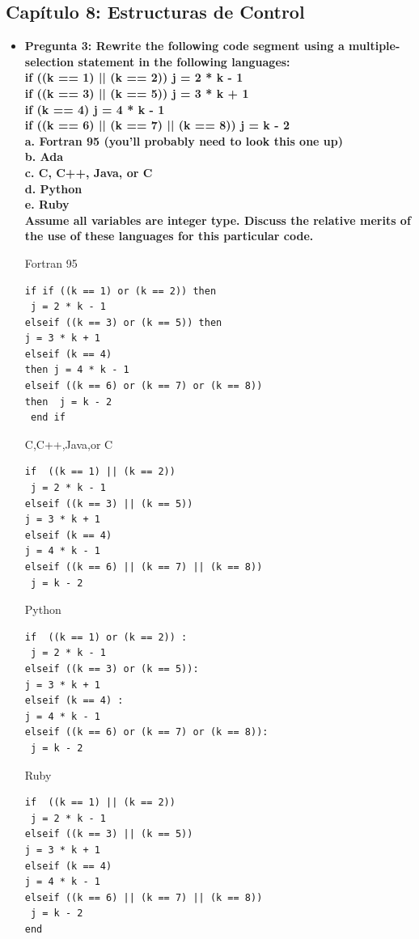 \documentclass[12pt,oneside]{article}
\begin{document}
		\subsection{Capítulo 8: Estructuras de Control}	
			\begin{itemize}
				\item {\bf Pregunta 3: Rewrite the following code segment using a multiple-selection statement
in the following languages:\\
if ((k == 1) || (k == 2)) j = 2 * k - 1\\
if ((k == 3) || (k == 5)) j = 3 * k + 1\\
if (k == 4) j = 4 * k - 1\\
if ((k == 6) || (k == 7) || (k == 8)) j = k - 2\\
a. Fortran 95 (you’ll probably need to look this one up)\\
b. Ada\\
c. C, C++, Java, or C\\
d. Python\\
e. Ruby\\
Assume all variables are integer type. Discuss the relative merits of the
use of these languages for this particular code.}	

Fortran  95
\begin{lstlisting}[frame=single]
if if ((k == 1) or (k == 2)) then 
 j = 2 * k - 1
elseif ((k == 3) or (k == 5)) then 
j = 3 * k + 1
elseif (k == 4) 
then j = 4 * k - 1
elseif ((k == 6) or (k == 7) or (k == 8))
then  j = k - 2
 end if 
\end{lstlisting}

C,C++,Java,or C
\begin{lstlisting}[frame=single]
if  ((k == 1) || (k == 2)) 
 j = 2 * k - 1
elseif ((k == 3) || (k == 5)) 
j = 3 * k + 1
elseif (k == 4) 
j = 4 * k - 1
elseif ((k == 6) || (k == 7) || (k == 8))
 j = k - 2 
\end{lstlisting}

Python 
\begin{lstlisting}[frame=single]
if  ((k == 1) or (k == 2)) :
 j = 2 * k - 1
elseif ((k == 3) or (k == 5)): 
j = 3 * k + 1
elseif (k == 4) :
j = 4 * k - 1
elseif ((k == 6) or (k == 7) or (k == 8)):
 j = k - 2 
\end{lstlisting}

Ruby
\begin{lstlisting}[frame=single]
if  ((k == 1) || (k == 2)) 
 j = 2 * k - 1
elseif ((k == 3) || (k == 5)) 
j = 3 * k + 1
elseif (k == 4) 
j = 4 * k - 1
elseif ((k == 6) || (k == 7) || (k == 8))
 j = k - 2 
end 
\end{lstlisting}



\end{itemize}
\end{document}
